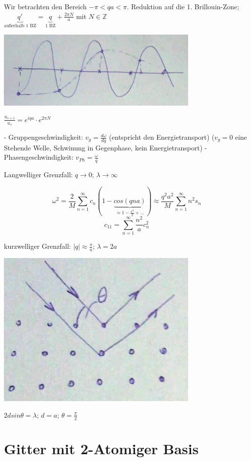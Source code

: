 Wir betrachten den Bereich \(-\pi < qa < \pi\). Reduktion auf die 1. Brillouin-Zone; \(\underbrace{q'}_{\text{außerhalb 1 BZ}}=\underbrace{q}_{\text{1 BZ}}+\frac{2\pi N}{a}\) mit \(N\in \mathbb Z\)

\includegraphics[width=0.75\textwidth]{kap06_03.png}

\(\frac{u_{s+1}}{u_s} = e^{iqa}\cdot e^{2\pi N}\)

- Gruppengeschwindigkeit: \(v_g = \frac{d\omega}{dq}\) (entspricht den Energietransport) (\(v_g=0\) eine Stehende Welle, Schwinung in Gegenphase, kein Energietransport)
- Phasengeschwindigkeit: \(v_{Ph} = \frac{\omega}{q}\)

Langwelliger Grenzfall: \(q\rightarrow 0\); \(\lambda \rightarrow \infty\)

\[\omega^2 = \frac{2}{M} \sum^{\infty}_{n=1}c_n(1-\underbrace{cos(qna)}_{\approx 1-\frac{x^2}{2}+...})\approx \frac{q^2a^2}{M}\sum^{\infty}_{n=1}n^2s_n\]
\[ c_{11} = \sum^{\infty}_{n=1} \frac{n^2}{a}c^2_n\]

kurzwelliger Grenzfall: \(|q|\approx \frac{\pi}{a}\); \(\lambda = 2a\)

 \includegraphics[width=0.75\textwidth]{kap06_04.png}

\(2dsin\theta=\lambda\); \(d=a\); \(\theta = \frac{\pi}{2}\)

\section{Gitter mit 2-Atomiger Basis}

